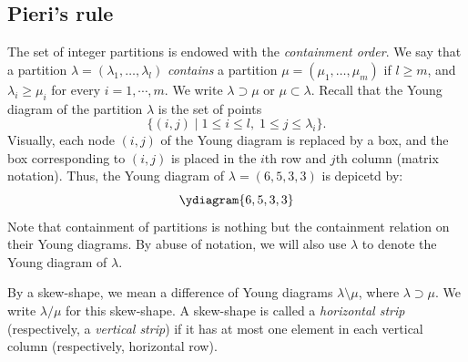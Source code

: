 \documentclass[12pt]{amsart}
\theoremstyle{definition}
\theoremstyle{example}
\begin{document}
\subsection{Pieri's rule}
\label{sec:pieri}
The set of integer partitions is endowed with the \emph{containment order}.
We say that a partition $\lambda=(\lambda_1,\dotsc,\lambda_l)$ \emph{contains} a partition $\mu=(\mu_1,\dotsc, \mu_m)$ if $l \geq m$, and $\lambda_i\geq \mu_i$ for every $i=1,\dotsb, m$.
We write $\lambda\supset\mu$ or $\mu \subset \lambda$.
Recall that the Young diagram of the partition $\lambda$ is the set of points 
\begin{displaymath}
\{(i, j)\mid 1\leq i\leq l,\; 1\leq j\leq \lambda_i\}.
\end{displaymath}
Visually, each node $(i,j)$ of the Young diagram is replaced by a box, and the box corresponding to $(i,j)$ is placed in the $i$th row and $j$th column (matrix notation).
Thus, the Young diagram of $\lambda=(6, 5, 3, 3)$ is depicetd by:
\begin{displaymath}
  \ydiagram{6,5,3,3}
\end{displaymath}
Note that containment of partitions is nothing but the containment relation on their Young diagrams.
By abuse of notation, we will also use $\lambda$ to denote the Young diagram of $\lambda$.

By a skew-shape, we mean a difference of Young diagrams $\lambda \setminus \mu$, where $\lambda \supset \mu$.
We write $\lambda/\mu$ for this skew-shape.
A skew-shape is called a \emph{horizontal strip} (respectively, a \emph{vertical strip}) if it has at most one element in each vertical column (respectively, horizontal row).
\end{document}
